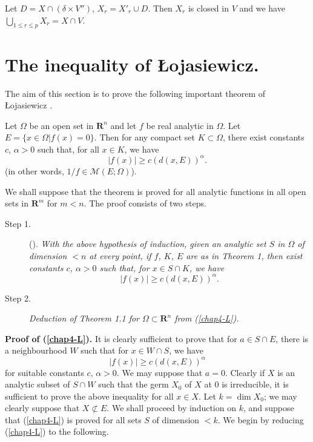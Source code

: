 Let $D = X \cap (\delta \times V'')$, $X_r = X'_r \cup D$. Then $X_r$ is closed in $V$ and we have $\bigcup\limits_{1 \leq r \leq p} X_r = X \cap V$.


\section[The inequality of {\L}ojasiewicz]{The inequality of {\L}ojasiewicz.}\label{chap4-sec4}%

The aim of this section is to prove the following important theorem of {\L}ojasiewicz \cite{S. Lojasiewicz : 1}.

\begin{theorem}\label{chap4-thm4.1}%
  Let $\Omega$ be an open set in $\mathbf{R}^n$ and let $f$ be real analytic in $\Omega$. Let $E = \{x \in \Omega |f(x) =0\}$. Then for any compact set $K \subset \Omega$, there exist constants $c$, $\alpha > 0$ such that, for all $x \in K$, we have
  $$
  |f(x)| \geq c(d(x, E))^\alpha .
  $$
   (in other words, $1/f \in \mathscr{M}(E;\Omega)$).
\end{theorem}

We shall suppose that the theorem is proved for all analytic functions in all open sets in $\mathbf{R}^m$ for $m<n$. The proof consists of two steps.

\begin{description}
  \item[Step 1.]  ().\label{chap4-L} \textit{With the above hypothesis of induction, given an analytic set $S$ in $\Omega$ of dimension $< n$ at every point, if $f$, $K$, $E$ are as in Theorem 1, then exist constants $c$, $\alpha > 0$ such that, for $x \in S \cap K$, we have}
 $$
|f(x)| \geq c (d (x, E))^{\alpha}.
$$

\item[Step 2.] \textit{Deduction of Theorem 1.1 for $\Omega \subset \mathbf{R}^n$ from (\ref{chap4-L}).}
\end{description}

\medskip
\noindent
\textbf{Proof of (\ref{chap4-L}).}  It is clearly sufficient to prove that for $a \in S \cap E$, there is a neighbourhood $W$ such that for $x \in W \cap S$, we have
$$
|f(x)| \geq c (d(x, E))^\alpha 
$$
for suitable constants $c$, $\alpha > 0$. We may suppose that $a=0$. Clearly if $X$ is an analytic subset of $S \cap W$ such that the germ $X_0$ of $X$ at $0$ is irreducible, it is sufficient to prove the above inequality for all $x \in X$. Let $k = \dim X_0$; we may clearly suppose that $X \nsubset E$. We shall proceed by induction on $k$, and suppose that (\ref{chap4-L}) is proved for all sets $S$ of dimension $<k$. We begin by reducing (\ref{chap4-L}) to the following. 

